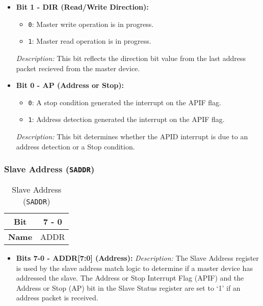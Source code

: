 \begin{itemize}
        \item \textbf{Bit 1 - DIR (Read/Write Direction):} 
        \begin{itemize}
            \item \texttt{0}: Master write operation is in progress.
            \item \texttt{1}: Master read operation is in progress.
        \end{itemize}
        \textit{Description:} This bit reflects the direction bit value from the last address packet recieved from the master device.
  
        \item \textbf{Bit 0 - AP (Address or Stop):} 
        \begin{itemize}
          \item \texttt{0}: A stop condition generated the interrupt on the APIF flag.
          \item \texttt{1}: Address detection generated the interrupt on the APIF flag.
        \end{itemize}
        \textit{Description:} This bit determines whether the APID interrupt is due to an address detection or a Stop condition.
    \end{itemize}
    
    \subsubsection{Slave Address (\texttt{SADDR})}
    \label{sec:saddr}
  
    \begin{table}[H]
      \centering
      \caption{Slave Address (\texttt{SADDR})}
      \begin{tabular}{@{}cc@{}}
          \toprule
          \textbf{Bit} & 7 - 0 \\ \midrule
          \textbf{Name} & ADDR \\ \bottomrule
      \end{tabular}
      \label{tab:saddr}
    \end{table}
  
    \begin{itemize}
      
      \item \textbf{Bits 7-0 - ADDR[7:0] (Address):} 
      \textit{Description:} The Slave Address register is used by the slave address match logic to determine if a master device
      has addressed the slave. The Address or Stop Interrupt Flag (APIF) and the Address or Stop (AP) bit in the
      Slave Status register are set to ‘1’ if an address packet is received.
    \end{itemize}
  
